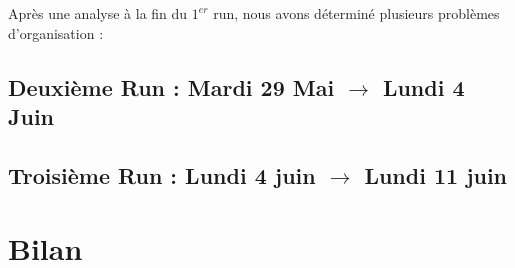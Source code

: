 \documentclass[11pt]{article}
\begin{document}
Après une analyse à la fin du $1^{er}$ run, nous avons déterminé plusieurs problèmes d'organisation : 

\begin{itemize}
\end{itemize}

\subsection{Deuxième Run : Mardi 29 Mai $\rightarrow$ Lundi 4 Juin}

\subsection{Troisième Run : Lundi 4 juin $\rightarrow$ Lundi 11 juin}

\section{Bilan}
\end{document}
